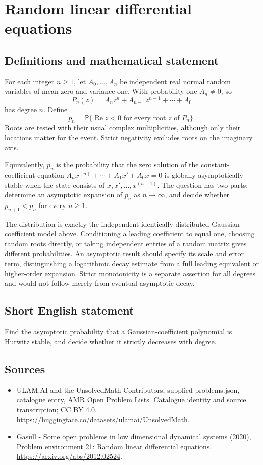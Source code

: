 \documentclass[11pt,a4paper]{article}
\begin{document}
\section*{Random linear differential equations}\label{statement}

\subsection{Definitions and mathematical statement}
For each integer $n\ge1$, let $A_0,\ldots,A_n$ be independent real normal
random variables of mean zero and variance one. With probability one
$A_n\ne0$, so
\[
 P_n(z)=A_nz^n+A_{n-1}z^{n-1}+\cdots+A_0
\]
has degree $n$. Define
\[
 p_n=\mathbb P\{\operatorname{Re}z<0
                 \text{ for every root }z\text{ of }P_n\}.
\]
Roots are tested with their usual complex multiplicities, although only
their locations matter for the event. Strict negativity excludes roots
on the imaginary axis.

Equivalently, $p_n$ is the probability that the zero solution of the
constant-coefficient equation
$A_nx^{(n)}+\cdots+A_1x'+A_0x=0$ is globally asymptotically stable
when the state consists of $x,x',\ldots,x^{(n-1)}$. The question has two
parts: determine an asymptotic expansion of $p_n$ as $n\to\infty$, and
decide whether $p_{n+1}<p_n$ for every $n\ge1$.

The distribution is exactly the independent identically distributed
Gaussian coefficient model above. Conditioning a leading coefficient to
equal one, choosing random roots directly, or taking independent entries
of a random matrix gives different probabilities. An asymptotic result
should specify its scale and error term, distinguishing a logarithmic
decay estimate from a full leading equivalent or higher-order expansion.
Strict monotonicity is a separate assertion for all degrees and would not
follow merely from eventual asymptotic decay.
\subsection{Short English statement}
Find the asymptotic probability that a Gaussian-coefficient polynomial is Hurwitz stable, and decide whether it strictly decreases with degree.
\subsection{Sources}
\begin{itemize}
\item[S1] ULAM.AI and the UnsolvedMath Contributors, supplied problems.json, catalogue entry, AMR Open Problem Lists. Catalogue identity and source transcription; CC BY 4.0.
\url{https://huggingface.co/datasets/ulamai/UnsolvedMath}.
\item[S2] Gasull - Some open problems in low dimensional dynamical systems (2020), Problem environment 21: Random linear differential equations. 
\url{https://arxiv.org/abs/2012.02524}.
\end{itemize}
\end{document}
